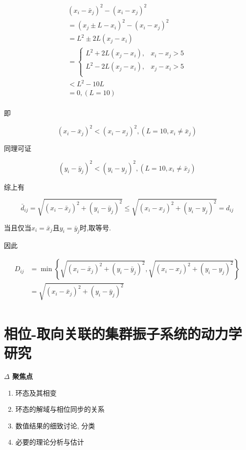 \documentclass{article}
\begin{document}
$$
\begin{array}{l}
	(x_i-\bar{x}_j)^2-(x_i-x_j)^2\\
	=\left( x_j\pm L-x_i \right) ^2-(x_i-x_j)^2\\
	=L^2\pm 2L\left( x_j-x_i \right)\\
	=\left\{ \begin{matrix}
	L^2+2L\left( x_j-x_i \right) ,&		x_i-x_j>5\\
	L^2-2L\left( x_j-x_i \right) ,&		x_j-x_i>5\\
\end{matrix} \right.\\
	<L^2-10L\\
	=0, \left( L=10 \right)\\
\end{array}
$$

即

$$
(x_i-\bar{x}_j)^2<(x_i-x_j)^2, \left( L=10, x_i\ne \bar{x}_j \right)
$$

同理可证

$$
(y_i-\bar{y}_j)^2<(y_i-y_j)^2, \left( L=10, x_i\ne \bar{x}_j \right)
$$

综上有

$$
\bar{d}_{ij}=\sqrt{(x_i-\bar{x}_j)^2+(y_i-\bar{y}_j)^2}\le \sqrt{(x_i-x_j)^2+(y_i-y_j)^2}=d_{ij}
$$

当且仅当$x_i=\bar{x}_j$且$y_i=\bar{y}_j$时,取等号.

因此

$$
\begin{aligned}
	D_{ij}&=\min \left\{ \sqrt{(x_i-\bar{x}_j)^2+(y_i-\bar{y}_j)^2},\sqrt{(x_i-x_j)^2+(y_i-y_j)^2} \right\}\\
	&=\sqrt{(x_i-\bar{x}_j)^2+(y_i-\bar{y}_j)^2}\\
\end{aligned}
$$

\newpage

\section{相位-取向关联的集群振子系统的动力学研究}

\textbf{$\Delta$ 聚焦点}
\begin{enumerate}
    \item 环态及其相变
    \item 环态的解域与相位同步的关系
    \item 数值结果的细致讨论, 分类
    \item 必要的理论分析与估计
\end{enumerate}
\end{document}

